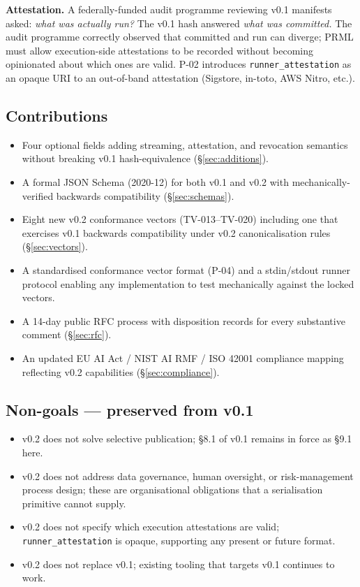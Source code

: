 \documentclass[11pt, a4paper]{article}
\begin{document}
\textbf{Attestation.} A federally-funded audit programme reviewing v0.1 manifests asked: \textit{what was actually run?} The v0.1 hash answered \textit{what was committed.} The audit programme correctly observed that committed and run can diverge; PRML must allow execution-side attestations to be recorded without becoming opinionated about which ones are valid. P-02 introduces \texttt{runner\_attestation} as an opaque URI to an out-of-band attestation (Sigstore, in-toto, AWS Nitro, etc.).

\subsection{Contributions}

\begin{itemize}[leftmargin=2em, itemsep=0.2em]
  \item Four optional fields adding streaming, attestation, and revocation semantics without breaking v0.1 hash-equivalence (§\ref{sec:additions}).
  \item A formal JSON Schema (2020-12) for both v0.1 and v0.2 with mechanically-verified backwards compatibility (§\ref{sec:schemas}).
  \item Eight new v0.2 conformance vectors (TV-013--TV-020) including one that exercises v0.1 backwards compatibility under v0.2 canonicalisation rules (§\ref{sec:vectors}).
  \item A standardised conformance vector format (P-04) and a stdin/stdout runner protocol enabling any implementation to test mechanically against the locked vectors.
  \item A 14-day public RFC process with disposition records for every substantive comment (§\ref{sec:rfc}).
  \item An updated EU AI Act / NIST AI RMF / ISO 42001 compliance mapping reflecting v0.2 capabilities (§\ref{sec:compliance}).
\end{itemize}

\subsection{Non-goals — preserved from v0.1}

\begin{itemize}[leftmargin=2em, itemsep=0.1em]
  \item v0.2 does not solve selective publication; §8.1 of v0.1 remains in force as §9.1 here.
  \item v0.2 does not address data governance, human oversight, or risk-management process design; these are organisational obligations that a serialisation primitive cannot supply.
  \item v0.2 does not specify which execution attestations are valid; \texttt{runner\_attestation} is opaque, supporting any present or future format.
  \item v0.2 does not replace v0.1; existing tooling that targets v0.1 continues to work.
\end{itemize}
\end{document}
